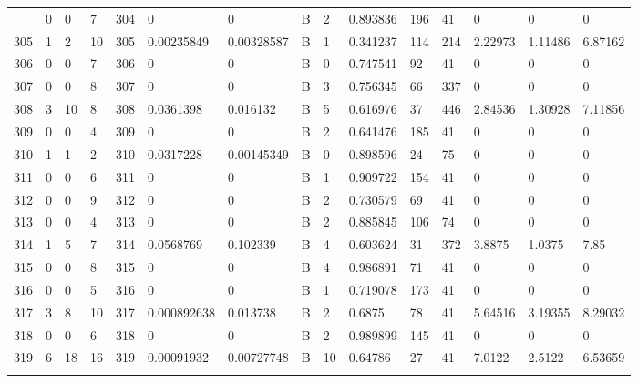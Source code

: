 \begin{latin}
\begin{longtable}{lllllllllllllll}
\begin{comment}
	304 & 0  & 0   & 7  & 304 & 0              & 0              & B & 2  & 0.893836 & 196  & 41   & 0       & 0       & 0       \\
	305 & 1  & 2   & 10 & 305 & 0.00235849     & 0.00328587     & B & 1  & 0.341237 & 114  & 214  & 2.22973 & 1.11486 & 6.87162 \\
	306 & 0  & 0   & 7  & 306 & 0              & 0              & B & 0  & 0.747541 & 92   & 41   & 0       & 0       & 0       \\
	307 & 0  & 0   & 8  & 307 & 0              & 0              & B & 3  & 0.756345 & 66   & 337  & 0       & 0       & 0       \\
	308 & 3  & 10  & 8  & 308 & 0.0361398      & 0.016132       & B & 5  & 0.616976 & 37   & 446  & 2.84536 & 1.30928 & 7.11856 \\
	309 & 0  & 0   & 4  & 309 & 0              & 0              & B & 2  & 0.641476 & 185  & 41   & 0       & 0       & 0       \\
	310 & 1  & 1   & 2  & 310 & 0.0317228      & 0.00145349     & B & 0  & 0.898596 & 24   & 75   & 0       & 0       & 0       \\
	311 & 0  & 0   & 6  & 311 & 0              & 0              & B & 1  & 0.909722 & 154  & 41   & 0       & 0       & 0       \\
	312 & 0  & 0   & 9  & 312 & 0              & 0              & B & 2  & 0.730579 & 69   & 41   & 0       & 0       & 0       \\
	313 & 0  & 0   & 4  & 313 & 0              & 0              & B & 2  & 0.885845 & 106  & 74   & 0       & 0       & 0       \\
	314 & 1  & 5   & 7  & 314 & 0.0568769      & 0.102339       & B & 4  & 0.603624 & 31   & 372  & 3.8875  & 1.0375  & 7.85    \\
	315 & 0  & 0   & 8  & 315 & 0              & 0              & B & 4  & 0.986891 & 71   & 41   & 0       & 0       & 0       \\
	316 & 0  & 0   & 5  & 316 & 0              & 0              & B & 1  & 0.719078 & 173  & 41   & 0       & 0       & 0       \\
	317 & 3  & 8   & 10 & 317 & 0.000892638    & 0.013738       & B & 2  & 0.6875   & 78   & 41   & 5.64516 & 3.19355 & 8.29032 \\
	318 & 0  & 0   & 6  & 318 & 0              & 0              & B & 2  & 0.989899 & 145  & 41   & 0       & 0       & 0       \\
	319 & 6  & 18  & 16 & 319 & 0.00091932     & 0.00727748     & B & 10 & 0.64786  & 27   & 41   & 7.0122  & 2.5122  & 6.53659 \\

\end{comment}
\end{longtable}
\end{latin}
